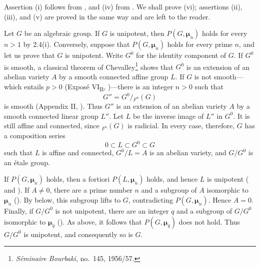 Assertion (i) follows from , and (iv) from .  We shall
prove (vi); assertions (ii), (iii), and (v) are proved in the same
way and are left to the reader.

Let \(G\) be an algebraic group.  If \(G\) is unipotent, then
\(P(G,\boldsymbol\mu_n)\) holds for every \(n>1\) by 2.4(i).
Conversely, suppose that \(P(G,\boldsymbol\mu_n)\) holds for every
prime \(n\), and let us prove that \(G\) is unipotent.  Write
\(G^0\) for the identity component of \(G\).  If \(G^0\) is
smooth, a classical theorem of
Chevalley\begingroup\renewcommand{\thefootnote}{*}\footnote[0]{%
\emph{Séminaire Bourbaki}, no.\ 145, 1956/57.}\endgroup
shows that \(G^0\) is an extension
of an abelian variety \(A\) by a smooth connected affine group
\(L\).  If \(G\) is not smooth---which entails \(p>0\)
(Exposé VI\textsubscript{B}, )---there is an integer \(n>0\)
such that
\[
  G''=G^0/{}_{F^n}(G)
\]
is smooth (Appendix II, ).  Thus \(G''\) is an extension of an
abelian variety \(A\) by a smooth connected linear group \(L''\).
Let \(L\) be the inverse image of \(L''\) in \(G^0\).  It is still
affine and connected, since \({}_{F^n}(G)\) is radicial.  In every
case, therefore, \(G\) has a composition series
\[
  0\subset L\subset G^0\subset G
\]
such that \(L\) is affine and connected, \(G^0/L=A\) is an
abelian variety, and \(G/G^0\) is an étale group.

If \(P(G,\boldsymbol\mu_n)\) holds, then a fortiori
\(P(L,\boldsymbol\mu_n)\) holds, and hence \(L\) is unipotent
( and ).  If \(A\ne0\), there are a prime number \(n\)
and a subgroup of \(A\) isomorphic to \(\boldsymbol\mu_n\) ().
By  below, this subgroup lifts to \(G\), contradicting
\(P(G,\boldsymbol\mu_n)\).  Hence \(A=0\).  Finally, if
\(G/G^0\) is not unipotent, there are an integer \(q\) and a
subgroup of \(G/G^0\) isomorphic to \(\boldsymbol\mu_q\) ().
As above, it follows that \(P(G,\boldsymbol\mu_q)\) does not hold.
Thus \(G/G^0\) is unipotent, and consequently so is \(G\).


